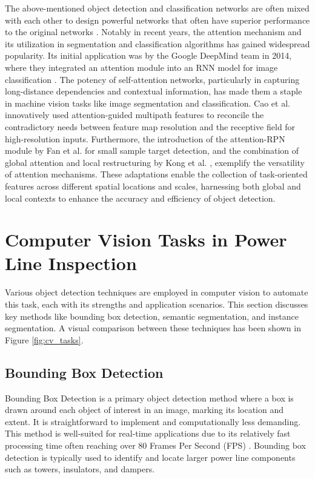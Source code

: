 The above-mentioned object detection and classification networks are often mixed with each other to design powerful networks that often have superior performance to the original networks \cite{tao_detection_2020}. Notably in recent years, the attention mechanism \cite{vaswani2017attention} and its utilization in segmentation and classification algorithms has gained widespread popularity. Its initial application was by the Google DeepMind team in 2014, where they integrated an attention module into an RNN model for image classification \cite{dosovitskiy2020image}. The potency of self-attention networks, particularly in capturing long-distance dependencies and contextual information, has made them a staple in machine vision tasks like image segmentation and classification. Cao et al. \cite{cao_accurate_2023} innovatively used attention-guided multipath features to reconcile the contradictory needs between feature map resolution and the receptive field for high-resolution inputs. Furthermore, the introduction of the attention-RPN module by Fan et al. \cite{fan_2019_few} for small sample target detection, and the combination of global attention and local restructuring by Kong et al. \cite{kong_context_2018}, exemplify the versatility of attention mechanisms. These adaptations enable the collection of task-oriented features across different spatial locations and scales, harnessing both global and local contexts to enhance the accuracy and efficiency of object detection. 

\section{Computer Vision Tasks in Power Line Inspection}\label{appendix:cv_tasks}
Various object detection techniques are employed in computer vision to automate this task, each with its strengths and application scenarios. This section discusses key methods like bounding box detection, semantic segmentation, and instance segmentation. A visual comparison between these techniques has been shown in Figure \ref{fig:cv_tasks}.

\subsection{Bounding Box Detection}
Bounding Box Detection is a primary object detection method where a box is drawn around each object of interest in an image, marking its location and extent. It is straightforward to implement and computationally less demanding. This method is well-suited for real-time applications due to its relatively fast processing time often reaching over 80 Frames Per Second (FPS) \cite{ge_birds_2022}. Bounding box detection is typically used to identify and locate larger power line components such as towers, insulators, and dampers.

